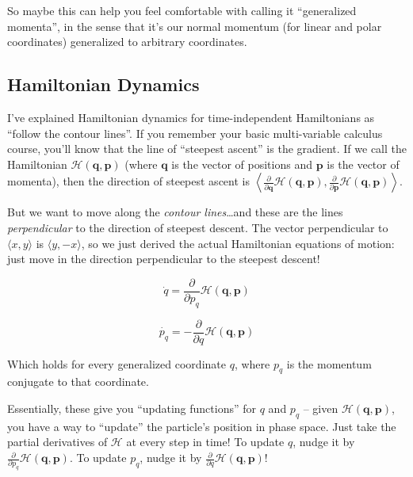 \documentclass[]{article}
\begin{document}
So maybe this can help you feel comfortable with calling it ``generalized
momenta'', in the sense that it's our normal momentum (for linear and polar
coordinates) generalized to arbitrary coordinates.

\subsection{Hamiltonian Dynamics}\label{hamiltonian-dynamics}

I've explained Hamiltonian dynamics for time-independent Hamiltonians as
``follow the contour lines''. If you remember your basic multi-variable calculus
course, you'll know that the line of ``steepest ascent'' is the gradient. If we
call the Hamiltonian \(\mathcal{H}(\mathbf{q},\mathbf{p})\) (where
\(\mathbf{q}\) is the vector of positions and \(\mathbf{p}\) is the vector of
momenta), then the direction of steepest ascent is
\(\left \langle \frac{\partial}{\partial \mathbf{q}} \mathcal{H}(\mathbf{q},\mathbf{p}), \frac{\partial}{\partial \mathbf{p}} \mathcal{H}(\mathbf{q},\mathbf{p}) \right \rangle\).

But we want to move along the \emph{contour lines}\ldots{}and these are the
lines \emph{perpendicular} to the direction of steepest descent. The vector
perpendicular to \(\langle x, y \rangle\) is \(\langle y, -x \rangle\), so we
just derived the actual Hamiltonian equations of motion: just move in the
direction perpendicular to the steepest descent!

\[
\dot{q} = \frac{\partial}{\partial p_q} \mathcal{H}(\mathbf{q},\mathbf{p})
\]

\[
\dot{p_q} = - \frac{\partial}{\partial q} \mathcal{H}(\mathbf{q},\mathbf{p})
\]

Which holds for every generalized coordinate \(q\), where \(p_q\) is the
momentum conjugate to that coordinate.

Essentially, these give you ``updating functions'' for \(q\) and \(p_q\) --
given \(\mathcal{H}(\mathbf{q},\mathbf{p})\), you have a way to ``update'' the
particle's position in phase space. Just take the partial derivatives of
\(\mathcal{H}\) at every step in time! To update \(q\), nudge it by
\(\frac{\partial}{\partial p_q} \mathcal{H}(\mathbf{q},\mathbf{p})\). To update
\(p_q\), nudge it by
\(\frac{\partial}{\partial q} \mathcal{H}(\mathbf{q},\mathbf{p})\)!
\end{document}
